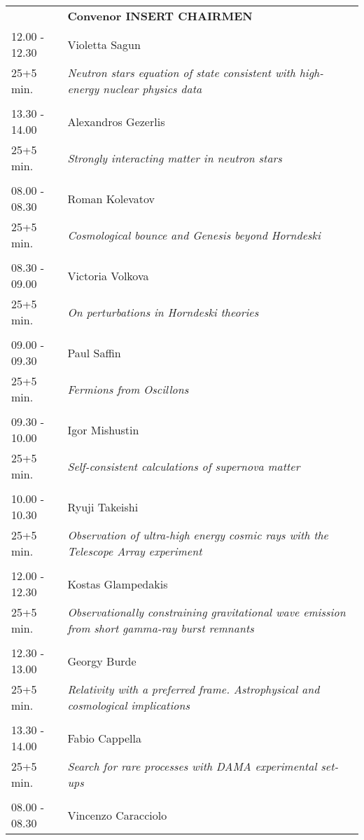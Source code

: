 \begin{longtable}{p{3cm}p{13cm}}
&\hfill {\bf Convenor INSERT CHAIRMEN }\\ 
12.00 - 12.30 & Violetta Sagun\\ 
25+5 min. & {\it Neutron stars equation of state consistent with high-energy nuclear physics data}\\ 
 & \\ 
13.30 - 14.00 & Alexandros Gezerlis\\ 
25+5 min. & {\it Strongly interacting matter in neutron stars}\\ 
 & \\ 
08.00 - 08.30 & Roman Kolevatov\\ 
25+5 min. & {\it Cosmological bounce and Genesis beyond Horndeski}\\ 
 & \\ 
08.30 - 09.00 & Victoria Volkova\\ 
25+5 min. & {\it On perturbations in Horndeski theories}\\ 
 & \\ 
09.00 - 09.30 & Paul Saffin\\ 
25+5 min. & {\it Fermions from Oscillons}\\ 
 & \\ 
09.30 - 10.00 & Igor Mishustin\\ 
25+5 min. & {\it Self-consistent calculations of supernova matter}\\ 
 & \\ 
10.00 - 10.30 & Ryuji Takeishi\\ 
25+5 min. & {\it Observation of ultra-high energy cosmic rays with the Telescope Array experiment}\\ 
 & \\ 
12.00 - 12.30 & Kostas Glampedakis\\ 
25+5 min. & {\it Observationally constraining gravitational wave emission from short gamma-ray burst remnants}\\ 
 & \\ 
12.30 - 13.00 & Georgy Burde\\ 
25+5 min. & {\it Relativity with a preferred frame. Astrophysical and cosmological implications}\\ 
 & \\ 
13.30 - 14.00 & Fabio Cappella\\ 
25+5 min. & {\it Search for rare processes with DAMA experimental set-ups}\\ 
 & \\ 
08.00 - 08.30 & Vincenzo Caracciolo\\ 

\end{longtable}
